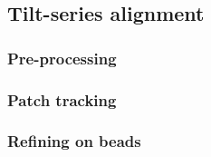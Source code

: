 \subsection{Tilt-series alignment} \label{sec:algo:tilt_series_alignment}

\subsubsection{Pre-processing}

\subsubsection{Patch tracking}

\subsubsection{Refining on beads}



